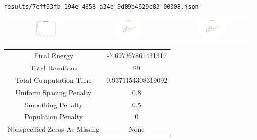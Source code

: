 \documentclass{report}
\begin{document}
\begin{lstlisting}
results/7eff93fb-194e-4858-a34b-9d09b4629c83_00008.json
\end{lstlisting}
\begin{tabular}{ccc}
\includegraphics[width=0.32\textwidth]{7eff93fb-194e-4858-a34b-9d09b4629c83_00008_energies.png}
&
\includegraphics[width=0.32\textwidth]{7eff93fb-194e-4858-a34b-9d09b4629c83_00008_initial_curves.png}
&
\includegraphics[width=0.32\textwidth]{7eff93fb-194e-4858-a34b-9d09b4629c83_00008_estimated_curves.png}
\\
\end{tabular}
\begin{tabular}{cc}
Final Energy&-7.697367861431317\\
Total Iterations&99\\
Total Computation Time&0.9371154308319092\\
Uniform Spacing Penalty&0.8\\
Smoothing Penalty&0.5\\
Population Penalty&0\\
Nonspecified Zeros As Missing&None\\
\end{tabular}
\end{document}
